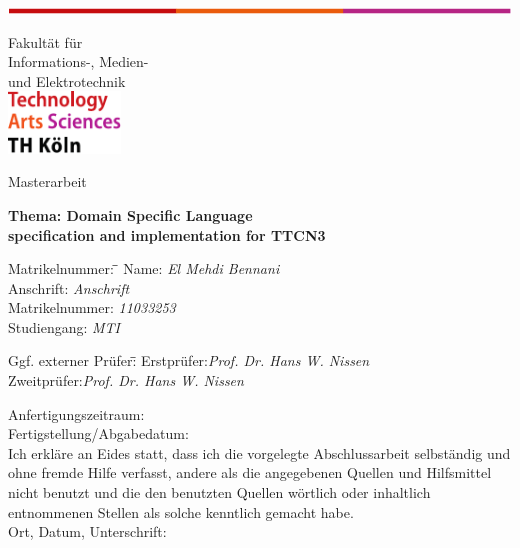 \begin{titlepage}
\vspace*{-20ex}
\includegraphics[width=\textwidth]{grafiken/Linie}\\[2ex]
{\sffamily 
Fakult\"at f\"ur\\
Informations-, Medien-\\
und Elektrotechnik\\[10ex]
\includegraphics[width=3cm]{grafiken/thk}\\
\begin{center}
 \Huge  Masterarbeit\\[4ex]
\end{center}
\Large
\textbf{Thema:  Domain Specific Language \\ specification and implementation for TTCN3}
\large 
\begin{tabbing}
Matrikelnummer: \hspace*{2ex}\= \=\kill
Name: \> \textit{El Mehdi Bennani}\\
Anschrift:\> \textit{Anschrift}\\
Matrikelnummer:\> \textit{11033253}	\\	
Studiengang:\> \textit{MTI}\\
\end{tabbing}
\begin{tabbing}
Ggf. externer Prüfer:\hspace*{2ex}\= \=\kill
Erstpr\"ufer:\>\textit{Prof. Dr. Hans W. Nissen}\\			
Zweitpr\"ufer:\>\textit{Prof. Dr. Hans W. Nissen}\\
\end{tabbing}
Anfertigungszeitraum:\\
Fertigstellung/Abgabedatum:\\[5ex]
%
Ich erkl\"are an Eides statt, dass ich die vorgelegte Abschlussarbeit selbst\"andig 
und ohne fremde Hilfe verfasst, andere als die angegebenen Quellen und 
Hilfsmittel nicht benutzt und die den benutzten Quellen w\"ortlich oder inhaltlich 
entnommenen Stellen als solche kenntlich gemacht habe.\\[6ex]
%
Ort, Datum, Unterschrift: \hrulefill
}
\normalsize
\end{titlepage}

